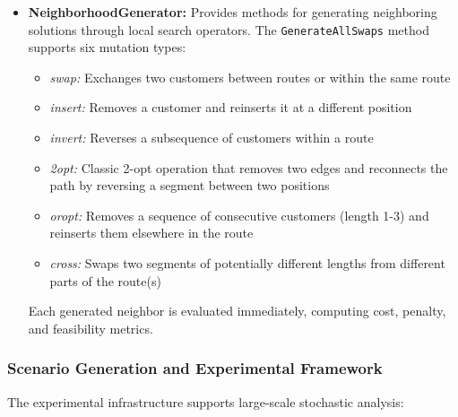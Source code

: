 \begin{itemize}
    \item \textbf{NeighborhoodGenerator:} Provides methods for generating neighboring solutions through local search operators. The \texttt{GenerateAllSwaps} method supports six mutation types:
    \begin{itemize}
        \item \textit{swap:} Exchanges two customers between routes or within the same route
        \item \textit{insert:} Removes a customer and reinserts it at a different position
        \item \textit{invert:} Reverses a subsequence of customers within a route
        \item \textit{2opt:} Classic 2-opt operation that removes two edges and reconnects the path by reversing a segment between two positions
        \item \textit{oropt:} Removes a sequence of consecutive customers (length 1-3) and reinserts them elsewhere in the route
        \item \textit{cross:} Swaps two segments of potentially different lengths from different parts of the route(s)
    \end{itemize}
    Each generated neighbor is evaluated immediately, computing cost, penalty, and feasibility metrics.
\end{itemize}

\subsubsection{Scenario Generation and Experimental Framework}

The experimental infrastructure supports large-scale stochastic analysis:

